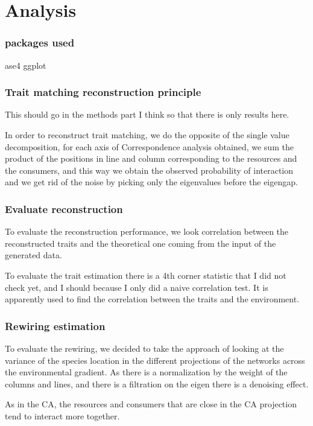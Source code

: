 \section{Analysis}

\subsubsection{packages used}

ase4 ggplot

\subsubsection{Trait matching reconstruction principle}

This should go in the methods part I think so that there is only results here.

In order to reconstruct trait matching, we do the opposite of the single value decomposition, for each axis of Correspondence analysis obtained, we sum the product of the positions in line and column corresponding to the resources and the consumers, and this way we obtain the observed probability of interaction and we get rid of the noise by picking only the eigenvalues before the eigengap.

\subsubsection{Evaluate reconstruction}

To evaluate the reconstruction performance, we look correlation between the reconstructed traits and the theoretical one coming from the input of the generated data.

To evaluate the trait estimation there is a 4th corner statistic that I did not check yet, and I should because I only did a naive correlation test. It is apparently used to find the correlation between the traits and the environment.

\subsubsection{Rewiring estimation}

To evaluate the rewiring, we decided to take the approach of looking at the variance of the species location in the different projections of the networks across the environmental gradient. 
As there is a normalization by the weight of the columns and lines, and there is a filtration on the eigen there is a denoising effect.

As in the CA, the resources and consumers that are close in the CA projection tend to interact more together.